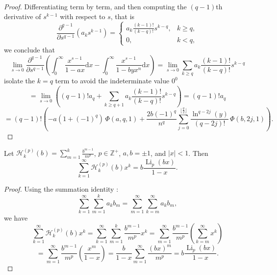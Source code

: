 \documentclass[11pt,reqno]{article}
\begin{document}
\begin{proof}
	Differentiating term by term, and then computing the $(q-1)$th derivative of $s^{k-1}$ with respect to $s$, that is
	\[\frac{\partial^{q-1}}{\partial s^{q-1}} \left( a_k s^{k-1} \right) = 
	\begin{cases} 
		a_k \frac{(k-1)!}{(k-q)!} s^{k-q}, & k \geqslant q, \\ 
		0, & k < q,
	\end{cases}\]
	we conclude that
	\[\lim_{s\to0}\frac{\partial^{q-1}}{\partial s^{q-1}}\left(	\int_0^\infty\frac{x^{s-1}}{1-ax}\mathrm{d} x-\int_0^\infty\frac{x^{s-1}}{1-byx^n}\mathrm{d} x\right)=\lim_{s\to0}\sum_{k \geqslant q} a_k \frac{(k-1)!}{(k-q)!} s^{k-q}\]
	isolate the $k=q$ term to avoid the indeterminate value $0^0$
	\[=\lim_{s\to0}\left((q-1)!a_q+\sum_{k \geqslant q+1} a_k \frac{(k-1)!}{(k-q)!} s^{k-q}\right)=(q-1)!a_{q}\]
	\[=(q-1)!\left(-a(1+{(-1)}^{q})\,\Phi(a,q,1)
	+\frac{2b{(-1)}^{q}}{n^{q}}\sum_{j=0}^{\lfloor\frac{q}{2}\rfloor}\frac{\ln^{q-2j}(y)}{(q-2j)!}\,\Phi(b,2j,1)\right).\]
\end{proof}
\begin{lemma}\label{generating function}
	Let $\mathcal{H}_k^{(p)}(b)=\sum_{m=1}^{k}\frac{b^{m-1}}{m^{p}}$, $p\in\mathbb{Z}^{+}$, $a,b=\pm1$, and $|x|<1$. Then
	\[\sum_{k=1}^{\infty} \mathcal{H}_k^{(p)}(b) x^{k}=b\frac{\operatorname{Li}_p(bx)}{1-x}.\]
\end{lemma}
\begin{proof}
	Using the summation identity \cite[p. 8]{ali}:
	\[\sum_{k=1}^\infty\sum_{m=1}^k a_k b_m=\sum_{m=1}^\infty\sum_{k=m}^\infty a_k b_m,\]
	we have
	\[\sum_{k=1}^{\infty} \mathcal{H}_k^{(p)}(b) x^{k}=\sum_{k=1}^{\infty} \sum_{m=1}^{k} \frac{b^{m-1}}{m^p} x^{k}=\sum_{m=1}^{\infty}\frac{b^{m-1}}{m^p} \left(\sum_{k=m}^{\infty} x^{k}\right)\]
	\[=\sum_{m=1}^{\infty}\frac{b^{m-1}}{m^p} \left( \frac{x^{m}}{1-x}\right)=\frac{b}{1-x}\sum_{m=1}^\infty\frac{{(bx)}^{m}}{m^p}=b\frac{\operatorname{Li}_p(bx)}{1-x}.\]
\end{proof}



\end{document}
